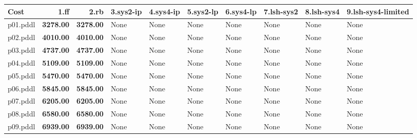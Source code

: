 \documentclass{article}
\begin{document}
\begin{tabular}{@{}lrrrrrrrrr@{}}
Cost & 1.ff & 2.rb & 3.sys2-ip & 4.sys4-ip & 5.sys2-lp & 6.sys4-lp & 7.lsh-sys2 & 8.lsh-sys4 & 9.lsh-sys4-limited \\
\midrule
p01.pddl & \textbf{3278.00} & \textbf{3278.00} & \multicolumn{1}{|l|}{None} & \multicolumn{1}{|l|}{None} & \multicolumn{1}{|l|}{None} & \multicolumn{1}{|l|}{None} & \multicolumn{1}{|l|}{None} & \multicolumn{1}{|l|}{None} & \multicolumn{1}{|l|}{None} \\
p02.pddl & \textbf{4010.00} & \textbf{4010.00} & \multicolumn{1}{|l|}{None} & \multicolumn{1}{|l|}{None} & \multicolumn{1}{|l|}{None} & \multicolumn{1}{|l|}{None} & \multicolumn{1}{|l|}{None} & \multicolumn{1}{|l|}{None} & \multicolumn{1}{|l|}{None} \\
p03.pddl & \textbf{4737.00} & \textbf{4737.00} & \multicolumn{1}{|l|}{None} & \multicolumn{1}{|l|}{None} & \multicolumn{1}{|l|}{None} & \multicolumn{1}{|l|}{None} & \multicolumn{1}{|l|}{None} & \multicolumn{1}{|l|}{None} & \multicolumn{1}{|l|}{None} \\
p04.pddl & \textbf{5109.00} & \textbf{5109.00} & \multicolumn{1}{|l|}{None} & \multicolumn{1}{|l|}{None} & \multicolumn{1}{|l|}{None} & \multicolumn{1}{|l|}{None} & \multicolumn{1}{|l|}{None} & \multicolumn{1}{|l|}{None} & \multicolumn{1}{|l|}{None} \\
p05.pddl & \textbf{5470.00} & \textbf{5470.00} & \multicolumn{1}{|l|}{None} & \multicolumn{1}{|l|}{None} & \multicolumn{1}{|l|}{None} & \multicolumn{1}{|l|}{None} & \multicolumn{1}{|l|}{None} & \multicolumn{1}{|l|}{None} & \multicolumn{1}{|l|}{None} \\
p06.pddl & \textbf{5845.00} & \textbf{5845.00} & \multicolumn{1}{|l|}{None} & \multicolumn{1}{|l|}{None} & \multicolumn{1}{|l|}{None} & \multicolumn{1}{|l|}{None} & \multicolumn{1}{|l|}{None} & \multicolumn{1}{|l|}{None} & \multicolumn{1}{|l|}{None} \\
p07.pddl & \textbf{6205.00} & \textbf{6205.00} & \multicolumn{1}{|l|}{None} & \multicolumn{1}{|l|}{None} & \multicolumn{1}{|l|}{None} & \multicolumn{1}{|l|}{None} & \multicolumn{1}{|l|}{None} & \multicolumn{1}{|l|}{None} & \multicolumn{1}{|l|}{None} \\
p08.pddl & \textbf{6580.00} & \textbf{6580.00} & \multicolumn{1}{|l|}{None} & \multicolumn{1}{|l|}{None} & \multicolumn{1}{|l|}{None} & \multicolumn{1}{|l|}{None} & \multicolumn{1}{|l|}{None} & \multicolumn{1}{|l|}{None} & \multicolumn{1}{|l|}{None} \\
p09.pddl & \textbf{6939.00} & \textbf{6939.00} & \multicolumn{1}{|l|}{None} & \multicolumn{1}{|l|}{None} & \multicolumn{1}{|l|}{None} & \multicolumn{1}{|l|}{None} & \multicolumn{1}{|l|}{None} & \multicolumn{1}{|l|}{None} & \multicolumn{1}{|l|}{None} \\

\end{tabular}
\end{document}
